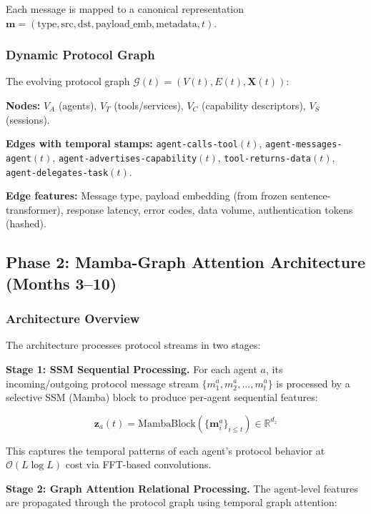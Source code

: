 \documentclass[12pt,a4paper]{article}
\newcommand{\R}{\mathbb{R}}
\newcommand{\calG}{\mathcal{G}}
\newcommand{\calO}{\mathcal{O}}
\begin{document}
Each message is mapped to a canonical representation $\mathbf{m} = (\text{type}, \text{src}, \text{dst}, \text{payload\_emb}, \text{metadata}, t)$.

\subsubsection{Dynamic Protocol Graph}

The evolving protocol graph $\calG(t) = (V(t), E(t), \mathbf{X}(t))$:

\textbf{Nodes:}
$V_A$ (agents), $V_T$ (tools/services), $V_C$ (capability descriptors), $V_S$ (sessions).

\textbf{Edges with temporal stamps:}
\texttt{agent-calls-tool}$(t)$, \texttt{agent-messages-agent}$(t)$, \texttt{agent-advertises-capability}$(t)$, \texttt{tool-returns-data}$(t)$, \texttt{agent-delegates-task}$(t)$.

\textbf{Edge features:} Message type, payload embedding (from frozen sentence-transformer), response latency, error codes, data volume, authentication tokens (hashed).

\subsection{Phase 2: Mamba-Graph Attention Architecture (Months 3--10)}

\subsubsection{Architecture Overview}

The architecture processes protocol streams in two stages:

\textbf{Stage 1: SSM Sequential Processing.} For each agent $a$, its incoming/outgoing protocol message stream $\{m_1^a, m_2^a, \ldots, m_t^a\}$ is processed by a selective SSM (Mamba) block to produce per-agent sequential features:

\begin{equation}
    \mathbf{z}_a(t) = \text{MambaBlock}\left(\{\mathbf{m}_i^a\}_{i \leq t}\right) \in \R^{d_z}
\end{equation}

This captures the temporal patterns of each agent's protocol behavior at $\calO(L \log L)$ cost via FFT-based convolutions.

\textbf{Stage 2: Graph Attention Relational Processing.} The agent-level features are propagated through the protocol graph using temporal graph attention:
\end{document}
